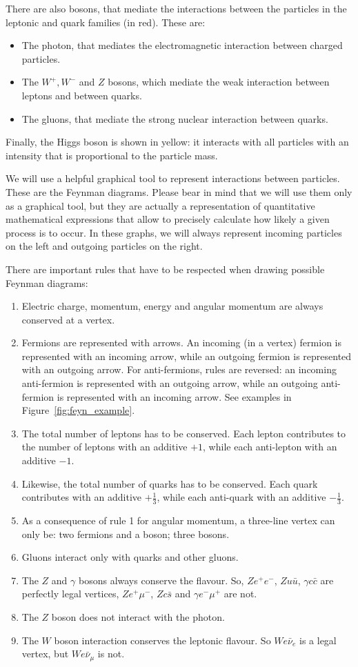 There are also bosons, that mediate the interactions between the particles in the leptonic and quark families (in red). These are: 
\begin{itemize}
\item The photon, that mediates the electromagnetic interaction between charged particles. 
\item The $W^+, W^{-}$ and $Z$ bosons, which mediate the weak interaction between leptons and between quarks. 
\item The gluons, that mediate the strong nuclear interaction between quarks. 
\end{itemize} 

Finally, the Higgs boson is shown in yellow: it interacts with all particles with an intensity that is proportional to the particle mass. 

We will use a helpful graphical tool to represent interactions between particles. These are the Feynman diagrams. Please bear in mind that we will use them only as a graphical tool, but they are actually a representation of quantitative mathematical expressions that allow to precisely calculate how likely a given process is to occur. In these graphs, we will always represent incoming particles on the left and outgoing particles on the right. 

There are important rules that have to be respected when drawing possible Feynman diagrams:
\begin{enumerate}
\item Electric charge, momentum, energy and angular momentum are always conserved at a vertex.
\item Fermions are represented with arrows. An incoming (in a vertex) fermion is represented with an incoming arrow, while an outgoing fermion is represented with an outgoing arrow. For anti-fermions, rules are reversed: an incoming anti-fermion is represented with an outgoing arrow, while an outgoing anti-fermion is represented with an incoming arrow. See examples in Figure~\ref{fig:feyn_example}. 
\item The total number of leptons has to be conserved. Each lepton contributes to the number of leptons with an additive $+1$, while each anti-lepton with an additive $-1$.
\item Likewise, the total number of quarks has to be conserved. Each quark contributes with an additive $+\frac{1}{3}$, while each anti-quark with an additive $-\frac{1}{3}$.
\item As a consequence of rule 1 for angular momentum, a three-line vertex can only be: two fermions and a boson; three bosons.
\item Gluons interact only with quarks and other gluons. 
\item The $Z$ and $\gamma$ bosons always conserve the flavour. So, $Ze^+e^-$, $Zu\bar{u}$, $\gamma c\bar{c}$ are perfectly legal vertices, $Z e^+ \mu^{-}$, $Zc\bar{s}$ and $\gamma e^-\mu^+$ are not.
\item The $Z$ boson does not interact with the photon.
\item The $W$ boson interaction conserves the leptonic flavour. So $We\bar{\nu}_e$ is a legal vertex, but $We\bar{\nu}_{\mu}$ is not. 
\end{enumerate}

